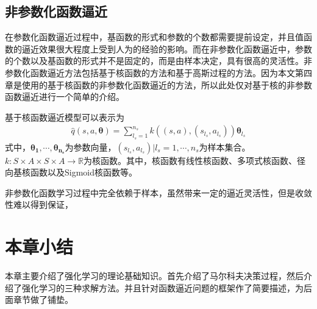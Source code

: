 \subsection{非参数化函数逼近}
在参数化函数逼近过程中，基函数的形式和参数的个数都需要提前设定，并且值函数的逼近效果很大程度上受到人为的经验的影响。而在非参数化函数逼近中，参数的个数以及基函数的形式并不是固定的，而是由样本决定，具有很高的灵活性。非参数化函数逼近方法包括基于核函数的方法和基于高斯过程的方法。因为本文第四章是使用的基于核函数的非参数化函数逼近的方法，所以此处仅对基于核的非参数函数逼近进行一个简单的介绍。

基于核函数逼近模型可以表示为
\begin{displaymath}
\begin{aligned}
\hat{q}(s,a,\mathbf{\theta})=\sum^{n_{s}}_{l_{s}=1}k((s,a),(s_{l_{s}},a_{l_{s}}))\mathbf{\theta}_{l_{s}}
\end{aligned}
\end{displaymath}
式中，$\mathbf{\theta_{1},\cdots,\theta_{n_{s}}}$为参数向量，${(s_{l_{s}},a_{l_{s}})|l_{s}=1,\cdots,n_{s}}$为样本集合。$k:S\times A \times S \times A \to \mathbb{R} $为核函数。其中，核函数有线性核函数、多项式核函数、径向基核函数以及Sigmoid核函数等。

非参数化函数学习过程中完全依赖于样本，虽然带来一定的逼近灵活性，但是收敛性难以得到保证，

\section{本章小结}
 本章主要介绍了强化学习的理论基础知识。首先介绍了马尔科夫决策过程，然后介绍了强化学习的三种求解方法。并且针对函数逼近问题的框架作了简要描述，为后面章节做了铺垫。
